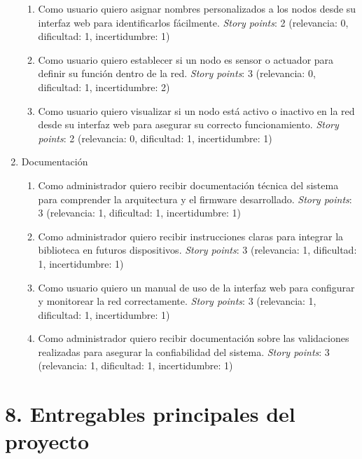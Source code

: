 \documentclass[
11pt, %
]{charter}
\begin{document}
\begin{enumerate}
\begin{enumerate}
	\item Como usuario quiero asignar nombres personalizados a los nodos desde su interfaz web para identificarlos fácilmente. \textit{Story points}: 2 (relevancia: 0, dificultad: 1, incertidumbre: 1)

	\item Como usuario quiero establecer si un nodo es sensor o actuador para definir su función dentro de la red. \textit{Story points}: 3 (relevancia: 0, dificultad: 1, incertidumbre: 2)

	\item Como usuario quiero visualizar si un nodo está activo o inactivo en la red desde su interfaz web para asegurar su correcto funcionamiento. \textit{Story points}: 2 (relevancia: 0, dificultad: 1, incertidumbre: 1)

\end{enumerate}

\item Documentación 
\begin{enumerate}
	\item Como administrador quiero recibir documentación técnica del sistema para comprender la arquitectura y el firmware desarrollado. \textit{Story points}: 3 (relevancia: 1, dificultad: 1, incertidumbre: 1)

	\item Como administrador quiero recibir instrucciones claras para integrar la biblioteca en futuros dispositivos. \textit{Story points}: 3 (relevancia: 1, dificultad: 1, incertidumbre: 1)

	\item Como usuario quiero un manual de uso de la interfaz web para configurar y monitorear la red correctamente. \textit{Story points}: 3 (relevancia: 1, dificultad: 1, incertidumbre: 1)

	\item Como administrador quiero recibir documentación sobre las validaciones realizadas para asegurar la confiabilidad del sistema. \textit{Story points}: 3 (relevancia: 1, dificultad: 1, incertidumbre: 1)

\end{enumerate}

\end{enumerate}


\section{8. Entregables principales del proyecto}
\label{sec:entregables}
\end{document}
